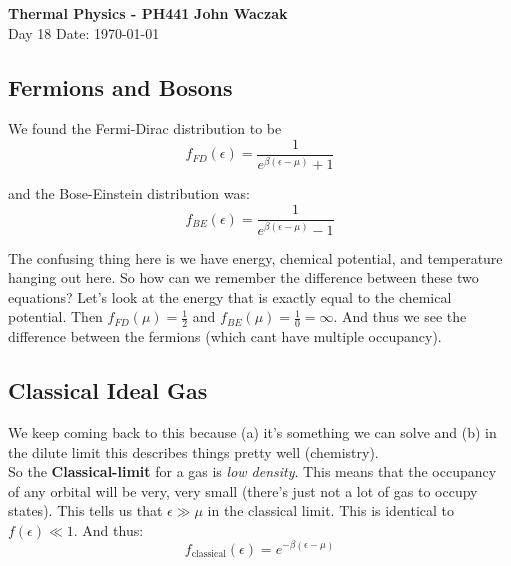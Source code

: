 \documentclass[a4paper, 11pt]{article}
\begin{document}
\noindent
\large\textbf{Thermal Physics - PH441} \hfill \textbf{John Waczak} \\
\normalsize Day 18 \hfill  Date: \today \\


\subsection*{Fermions and Bosons}	
	We found the Fermi-Dirac distribution to be
		\begin{equation*}
			f_{FD}(\epsilon) = \frac{1}{e^{\beta(\epsilon-\mu)}+1} 
		\end{equation*}
		
	\noindent and the Bose-Einstein distribution was: 
		\begin{equation*}
			f_{BE}(\epsilon) = \frac{1}{e^{\beta(\epsilon-\mu)}-1}
		\end{equation*}
	
	\noindent The confusing thing here is we have energy, chemical potential, and temperature hanging out here. So how can we remember the difference between these two equations? Let's look at the energy that is exactly equal to the chemical potential. Then $f_{FD}(\mu) = \frac{1}{2}$ and $f_{BE}(\mu) = \frac{1}{0}=\infty$. And thus we see the difference between the fermions (which cant have multiple occupancy). 
	
	
	
	
\subsection*{Classical Ideal Gas} 
	We keep coming back to this because (a) it's something we can solve and (b) in the dilute limit this describes things pretty well (chemistry). \\ 
	
	\noindent So the \textbf{Classical-limit} for a gas is \textit{low density}. This means that the occupancy of any orbital will be very, very small (there's just not a lot of gas to occupy states). This tells us that $\epsilon \gg \mu$ in the classical limit. This is identical to $f(\epsilon)\ll 1$. And thus: 
		\begin{equation*}
			f_{\text{classical}}(\epsilon) = e^{-\beta(\epsilon-\mu)}
		\end{equation*}
	
\end{document}
